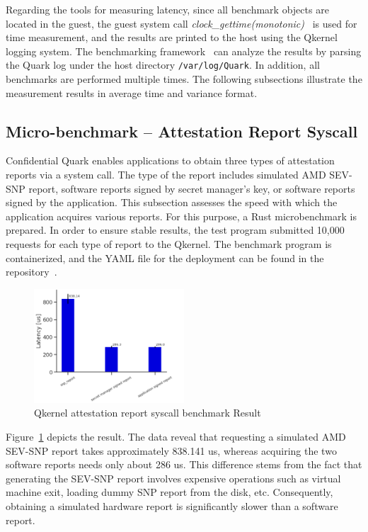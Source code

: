 Regarding the tools for measuring latency, since all benchmark objects are located in the guest, the guest system call \emph{clock\_gettime(monotonic)}~\cite*{clock_gettime} is used for time measurement, and the results are printed to the host using the Qkernel logging system. The 
benchmarking framework~\cite*{benchamark_framework} can analyze the results by parsing the Quark log under the host directory \texttt{/var/log/Quark}. In addition, all benchmarks are performed multiple times. The following subsections illustrate the measurement results in average time and variance format.

\subsection{Micro-benchmark – Attestation Report Syscall}
\label{Attestation_Report_Syscall}

Confidential Quark enables applications to obtain three types of attestation reports via a system call. The type of the report includes simulated AMD SEV-SNP report, software reports signed by secret manager's key, or software reports signed by the application. This subsection assesses the speed with which the 
application acquires various reports. For this purpose, a Rust microbenchmark\cite*{benchamark_Attestation_Report_Syscall} is prepared. In order to ensure stable results, the test program submitted 10,000 requests for each type of report to the Qkernel. The benchmark program is containerized, 
and the YAML file for the deployment can be found in the repository~\cite*{perf_test_repo}.

\begin{figure}[!htb]
    \centering
    \includegraphics[width=0.5\textwidth]{images/perf_attestation_report_result.PNG}
    \caption[Benchmark result of attestation report syscall]{Qkernel attestation report syscall benchmark Result}
    \label{fig:perf_attestation_report_result}
\end{figure}

Figure~\ref{fig:perf_attestation_report_result} depicts the result. The data reveal that requesting a simulated AMD SEV-SNP report takes approximately 838.141 us, whereas acquiring the two software reports needs only about 286 us. This difference stems from the fact that generating the SEV-SNP report involves expensive operations 
such as virtual machine exit, loading dummy SNP report from the disk, etc. Consequently, obtaining a simulated hardware report is significantly slower than a software report.


